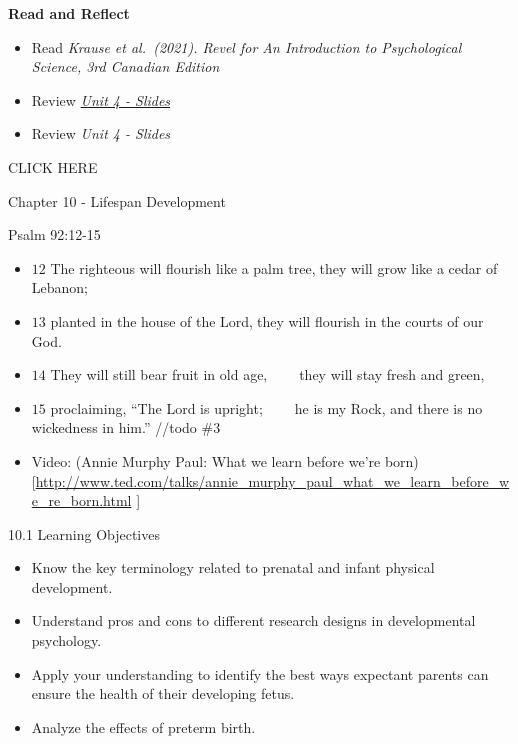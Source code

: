 \documentclass[
]{book}
\providecommand{\tightlist}{%
  \setlength{\itemsep}{0pt}\setlength{\parskip}{0pt}}
\begin{document}
\textbf{Read and Reflect}

\begin{itemize}
\tightlist
\item
  Read \emph{Krause et al.~(2021). Revel for An Introduction to Psychological Science, 3rd Canadian Edition}\\
\item
  Review \href{PSYC106-CH10LifespanDevelopment-3rdEd.pptx}{\emph{Unit 4 - Slides}}\\
\item
  Review \emph{Unit 4 - Slides}
\end{itemize}

CLICK HERE

Chapter 10 - Lifespan Development

Psalm 92:12-15

\begin{itemize}
\tightlist
\item
  \(\scriptstyle 12\) The righteous will flourish like a palm tree,they will grow like a cedar of Lebanon;
\item
  \(\scriptstyle 13\) planted in the house of the Lord,they will flourish in the courts of our God.
\item
  \(\scriptstyle 14\) They will still bear fruit in old age,~~~~they will stay fresh and green,
\item
  \(\scriptstyle 15\) proclaiming, ``The Lord is upright;~~~~he is my Rock, and there is no wickedness in him.''
  //todo \#3
\item
  Video: (Annie Murphy Paul: What we learn before we're born){[}\url{http://www.ted.com/talks/annie_murphy_paul_what_we_learn_before_we_re_born.html} {]}
\end{itemize}

10.1 Learning Objectives

\begin{itemize}
\tightlist
\item
  Know the key terminology related to prenatal and infant physical development.\\
\item
  Understand pros and cons to different research designs in developmental psychology.\\
\item
  Apply your understanding to identify the best ways expectant parents can ensure the health of their developing fetus.\\
\item
  Analyze the effects of preterm birth.
\end{itemize}
\end{document}
